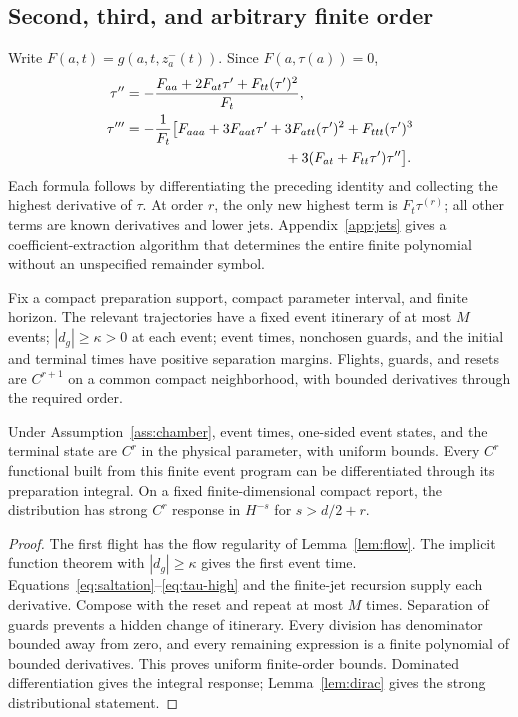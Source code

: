 \subsection{Second, third, and arbitrary finite order}
Write $F(a,t)=g(a,t,z_a^-(t))$. Since $F(a,\tau(a))=0$,
\begin{align}
 \tau''&=-\frac{F_{aa}+2F_{at}\tau'+F_{tt}(\tau')^2}{F_t},\\
 \tau'''&=-\frac{1}{F_t}\bigl[F_{aaa}+3F_{aat}\tau'+3F_{att}(\tau')^2
 +F_{ttt}(\tau')^3\notag\\
 &\hspace{40mm}+3(F_{at}+F_{tt}\tau')\tau''\bigr].
 \label{eq:tau-high}
\end{align}
Each formula follows by differentiating the preceding identity and collecting the highest derivative of $\tau$. At order $r$, the only new highest term is $F_t\tau^{(r)}$; all other terms are known derivatives and lower jets. Appendix~\ref{app:jets} gives a coefficient-extraction algorithm that determines the entire finite polynomial without an unspecified remainder symbol.

\begin{assumption}\label{ass:chamber}
Fix a compact preparation support, compact parameter interval, and finite horizon. The relevant trajectories have a fixed event itinerary of at most $M$ events; $|d_g|\ge\kappa>0$ at each event; event times, nonchosen guards, and the initial and terminal times have positive separation margins. Flights, guards, and resets are $C^{r+1}$ on a common compact neighborhood, with bounded derivatives through the required order.
\end{assumption}

\begin{theorem}\label{thm:chamber}
Under Assumption~\ref{ass:chamber}, event times, one-sided event states, and the terminal state are $C^r$ in the physical parameter, with uniform bounds. Every $C^r$ functional built from this finite event program can be differentiated through its preparation integral. On a fixed finite-dimensional compact report, the distribution has strong $C^r$ response in $H^{-s}$ for $s>d/2+r$.
\end{theorem}
\begin{proof}
The first flight has the flow regularity of Lemma~\ref{lem:flow}. The implicit function theorem with $|d_g|\ge\kappa$ gives the first event time. Equations~\eqref{eq:saltation}--\eqref{eq:tau-high} and the finite-jet recursion supply each derivative. Compose with the reset and repeat at most $M$ times. Separation of guards prevents a hidden change of itinerary. Every division has denominator bounded away from zero, and every remaining expression is a finite polynomial of bounded derivatives. This proves uniform finite-order bounds. Dominated differentiation gives the integral response; Lemma~\ref{lem:dirac} gives the strong distributional statement.
\end{proof}

